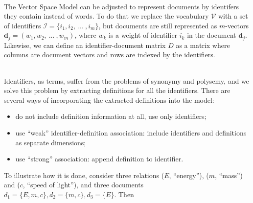 \ \\


The Vector Space Model can be adjusted to represent documents by identifers
they contain instead of words. To do that we replace the vocabulary $\mathcal V$
with  a set of identifiers $\mathcal I = \{ i_1, i_2, \ ... \ , i_m \}$,
but documents are still represented as $m$-vectors $\mathbf d_j = (w_1, w_2, \ ... \ , w_m)$,
where $w_k$ is a weight of identifier $i_k$ in the document $\mathbf d_j$.
Likewise, we can define an identifier-document matrix $D$ as a matrix where
columns are document vectors and rows are indexed by the identifiers.

\ \\

Identifiers, as terms, suffer from the problems of synonymy and polysemy,
and we solve this problem by extracting definitions for all the identifiers.
There are several ways of incorporating the extracted definitions into the
model:

\begin{itemize}
\itemsep1pt\parskip0pt
  \item do not include definition information at all, use only identifiers;
  \item use ``weak'' identifier-definition association: include identifiers and
        definitions as separate dimensions;
  \item use ``strong'' association: append definition to identifier.
\end{itemize}

To illustrate how it is done, consider three relations ($E$, ``energy''),
($m$, ``mass'') and ($c$, ``speed of light''), and three documents
$d_1 = \{E, m, c\}, d_2 = \{ m, c\}, d_3 = \{ E \}$. Then

